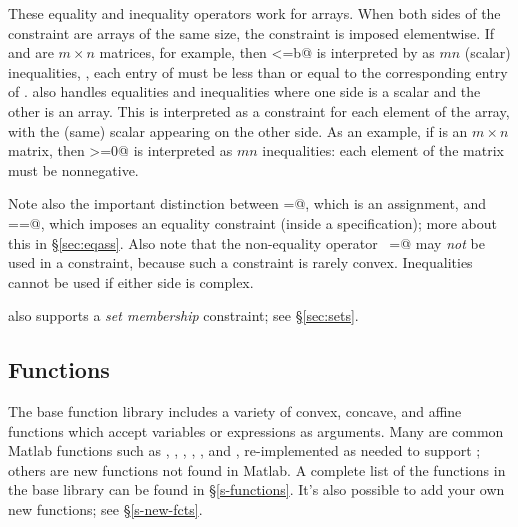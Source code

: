 \documentclass[12pt]{article}
\begin{document}
These equality and inequality operators work for arrays.
When both sides of the constraint are arrays of the same size,
the constraint is imposed elementwise.  If \verb@a@ and \verb@b@
are $m \times n$ matrices, for example, then \verb@a<=b@
is interpreted by \cvx as $mn$ (scalar) inequalities, \ie,
each entry of \verb@a@ must be less than or equal to
the corresponding entry of \verb@b@.
\cvx also handles equalities and inequalities where one side is 
a scalar and the other is an array.  This is interpreted as a
constraint for each element of the array, with the (same) scalar
appearing on the other side.
As an example, if \verb@a@ is an $m\times n$ matrix, then \verb@a>=0@ 
is interpreted as $mn$ inequalities: each element of the matrix
must be nonnegative.

Note also the important distinction between \verb@=@, which is an 
assignment, and \verb@==@, which imposes an equality constraint
(inside a \cvx specification); more about this in \S\ref{sec:eqass}.
Also note that the non-equality operator \verb@~=@ may \emph{not}
be used in a constraint, because such a constraint is rarely convex.
Inequalities cannot be used if either side is complex.

\cvx also supports a \emph{set membership} constraint; 
see \S\ref{sec:sets}.

\subsection{Functions}

The base \cvx function library
includes a variety of convex, concave, and affine functions
which accept \cvx variables or expressions as arguments.
Many are common Matlab functions
such as \verb@sum@, \verb@trace@, \verb@diag@, \verb@sqrt@,
\verb@max@, and \verb@min@,
re-implemented as needed to support \cvx; others are new
functions not found in Matlab.
A complete list of the functions in the base library 
can be found in \S\ref{s-functions}.
It's also possible to add your own new functions;
see \S\ref{s-new-fcts}.
\end{document}

